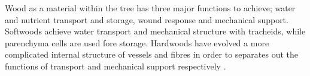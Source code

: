 Wood as a material within the tree has three major functions to achieve; water
and nutrient transport and storage, wound response and mechanical support. Softwoods
achieve water transport and mechanical structure with tracheids, while
parenchyma cells are used fore storage. Hardwoods have evolved a more
complicated internal structure of vessels and fibres in order to separates out
the functions of transport and mechanical support respectively \cite{walker1993primary}.